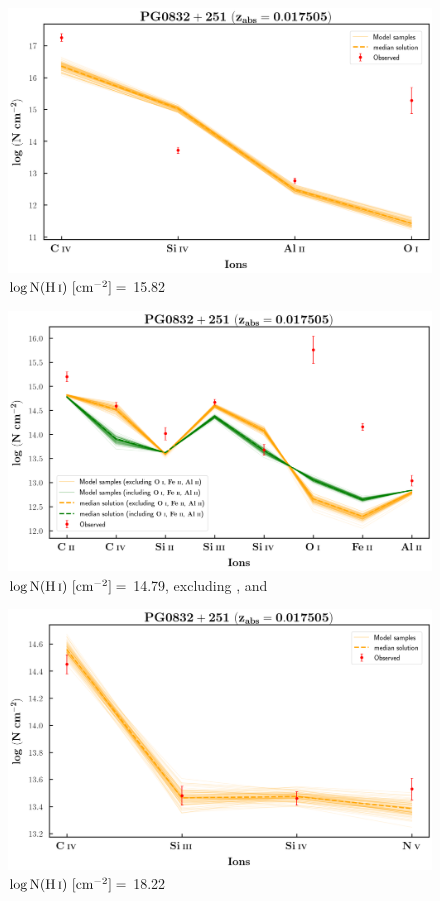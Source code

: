   
  \begin{figure}[!h]
      \centering
      \includegraphics[width=0.9\linewidth]{Ionisation-Modelling-Plots/pg0832-z=0.017505-compI_logZ=-1.png}
      \caption{$\log \text{N}(\ion{H}{i}) \ [\text{cm}^{-2}]=$ 15.82}
  \end{figure}
  
  \newpage
  
  \begin{figure}[!h]
      \centering
      \includegraphics[width=0.9\linewidth]{Ionisation-Modelling-Plots/pg0832-z=0.017505-compII_logZ=-1_OI_FeII__AlII.png}
      \caption{$\log \text{N}(\ion{H}{i}) \ [\text{cm}^{-2}]=$ 14.79, excluding ,  and }
  \end{figure}
  
  \begin{figure}[!b]
      \centering
      \includegraphics[width=0.9\linewidth]{Ionisation-Modelling-Plots/pg0832-z=0.017505-compIII_logZ=-1.png}
      \caption{$\log \text{N}(\ion{H}{i}) \ [\text{cm}^{-2}]=$ 18.22}
  \end{figure}
  
